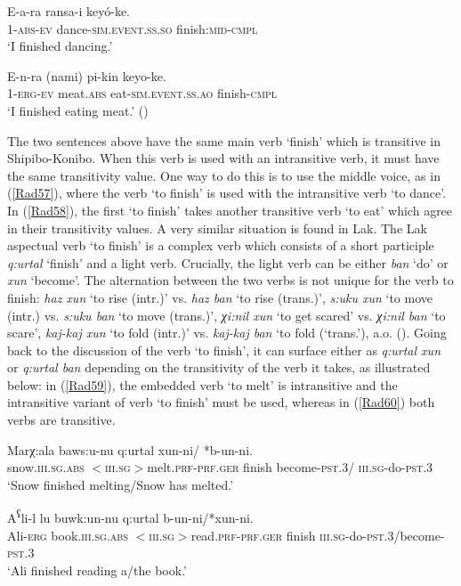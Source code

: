 \documentclass[output=paper]{langscibook}
\begin{document}
\ea\label{Rad57}
\gll E-a-ra ransa-i keyó-ke.\\
1-\textsc{abs-ev} dance-\textsc{sim.event.ss.so} finish:\textsc{mid-cmpl}\\
\glt ‘I finished dancing.’
\z 

\ea\label{Rad58}
\gll E-n-ra (nami) pi-kin keyo-ke.\\
1-\textsc{erg-ev} meat.\textsc{abs} eat-\textsc{sim.event.ss.ao} finish-\textsc{cmpl}\\
\glt ‘I finished eating meat.’  (\citealt[202]{Valenzuela2011})    
\z

The two sentences above have the same main verb ‘finish’ which is transitive in Shipibo-Konibo. When this verb is used with an intransitive verb, it must have the same transitivity value. One way to do this is to use the middle voice, as in (\ref{Rad57}), where the verb ‘to finish’ is used with the intransitive verb ‘to dance’. In (\ref{Rad58}), the first ‘to finish’ takes another transitive verb ‘to eat’ which agree in their transitivity values.
A very similar situation is found in Lak. The Lak aspectual verb ‘to finish’ is a complex verb which consists of a short participle \textit{q:urtal} ‘finish’ and a light verb.  Crucially, the light verb can be either \textit{ban} ‘do’ or \textit{xun} ‘become’. The alternation between the two verbs is not unique for the verb to finish: \textit{haz xun} ‘to rise (intr.)’ vs. \textit{haz ban} ‘to rise (trans.)’, \textit{s:uku xun} ‘to move (intr.) vs. \textit{s:uku ban} ‘to move (trans.)’, \textit{χi:nil xun} ‘to get scared’ vs. \textit{χi:nil ban} ‘to scare’, \textit{kaj-kaj xun} ‘to fold (intr.)’ vs. \textit{kaj-kaj ban} ‘to fold (‘trans.’), a.o. (\citealt[42]{Eldarova1995}). Going back to the discussion of the verb ‘to finish’, it can surface either as \textit{q:urtal xun} or \textit{q:urtal ban} depending on the transitivity of the verb it takes, as illustrated below: in (\ref{Rad59}), the embedded verb ‘to melt’ is intransitive and the intransitive variant of verb ‘to finish’ must be used, whereas in (\ref{Rad60}) both verbs are transitive.

\ea\label{Rad59}
\gll Marχ:ala baws:u-nu q:urtal xun-ni/ *b-un-ni.\\
 snow.\textsc{iii.sg.abs} \textsc{$<$iii.sg$>$}melt.\textsc{prf-prf.ger} finish become-\textsc{pst.3}/ \textsc{iii.sg}-do-\textsc{pst.3}\\
\glt ‘Snow finished melting/Snow has melted.’
\z 

\ea\label{Rad60}
\gll A\textsuperscript{ʕ}li-l lu buwk:un-nu q:urtal b-un-ni/*xun-ni.\\
Ali-\textsc{erg} book.\textsc{iii.sg.abs} \textsc{$<$iii.sg$>$}read.\textsc{prf-prf.ger} finish \textsc{iii.sg}-do-\textsc{pst.3}/become-\textsc{pst.3}\\
\glt ‘Ali finished reading a/the book.’
\z 
\end{document}
